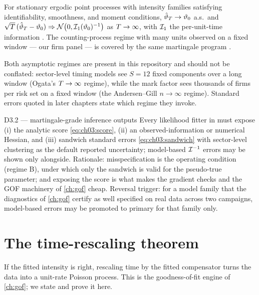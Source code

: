 \begin{theorem}\label{thm:ch03:mle}
For stationary ergodic point processes with intensity families satisfying
identifiability, smoothness, and moment conditions,
$\hat{\vartheta}_{T} \to \vartheta_0$ a.s.\ and
$\sqrt{T}\,(\hat{\vartheta}_{T} - \vartheta_0) \Rightarrow
\mathcal N\big(0, \mathcal{I}_1(\vartheta_0)^{-1}\big)$ as
$T \to \infty$, with $\mathcal{I}_1$ the per-unit-time information
\citep{ogata1978}. The counting-process regime with many units observed on
a fixed window --- our firm panel --- is covered by the same martingale
program \citep{andersengill1982,abgk1993}.
\end{theorem}

Both asymptotic regimes are present in this repository and should not be
conflated: sector-level timing models see $S = 12$ fixed components over a
long window (Ogata's $T\to\infty$ regime), while the mark factor sees
thousands of firms per risk set on a fixed window (the Andersen--Gill
$n\to\infty$ regime). Standard errors quoted in later chapters state which
regime they invoke.

\begin{decision}{D3.2 --- martingale-grade inference outputs}
Every likelihood fitter in \modrepo{} must expose (i) the analytic score
\cref{eq:ch03:score}, (ii) an observed-information or numerical Hessian,
and (iii) sandwich standard errors \cref{eq:ch03:sandwich} with
sector-level clustering as the default reported uncertainty; model-based
$\mathcal{I}^{-1}$ errors may be shown only alongside. Rationale:
misspecification is the operating condition (regime B), under which only
the sandwich is valid for the pseudo-true parameter; and exposing the
score is what makes the gradient checks and the GOF machinery of
\cref{ch:gof} cheap. Reversal trigger: for a model family that the
diagnostics of \cref{ch:gof} certify as well specified on real data across
two campaigns, model-based errors may be promoted to primary for that
family only.
\end{decision}

\section{The time-rescaling theorem}\label{ch03:sec:rescaling}

If the fitted intensity is right, rescaling time by the fitted compensator
turns the data into a unit-rate Poisson process. This is the
goodness-of-fit engine of \cref{ch:gof}; we state and prove it here.

